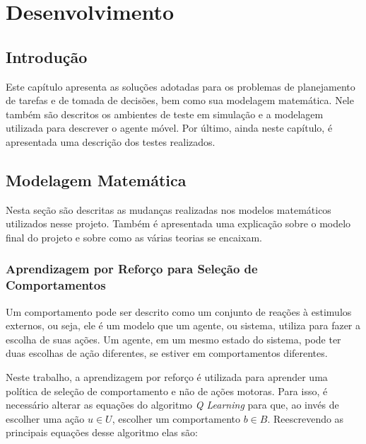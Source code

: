 


\chapter{Desenvolvimento} \label{chap:Desenvolvimento}


\section{Introdução}

Este capítulo apresenta as soluções adotadas para os problemas de planejamento de tarefas e de tomada de decisões, bem como sua modelagem matemática. Nele também são descritos os ambientes de teste em simulação e a modelagem utilizada para descrever o agente móvel. Por último, ainda neste capítulo, é apresentada uma descrição dos testes realizados.

\section{Modelagem Matemática}

Nesta seção são descritas as mudanças realizadas nos modelos matemáticos utilizados nesse projeto. Também é apresentada uma explicação sobre o modelo final do projeto e sobre como as várias teorias se encaixam.

\subsection{Aprendizagem por Reforço para Seleção de Comportamentos} \label{subsection:QLearningSelecaoDeComportamento}

Um comportamento pode ser descrito como um conjunto de reações à estimulos externos, ou seja, ele é um modelo que um agente, ou sistema, utiliza para fazer a escolha de suas ações. Um agente, em um mesmo estado do sistema, pode ter duas escolhas de ação diferentes, se estiver em comportamentos diferentes.

Neste trabalho, a aprendizagem por reforço é utilizada para aprender uma política de seleção de comportamento e não de ações motoras. Para isso, é necessário alterar as equações do algoritmo \textit{Q Learning} para que, ao invés de escolher uma ação $ u \in U $, escolher um comportamento $ b \in B $. Reescrevendo as principais equações desse algoritmo elas são:

